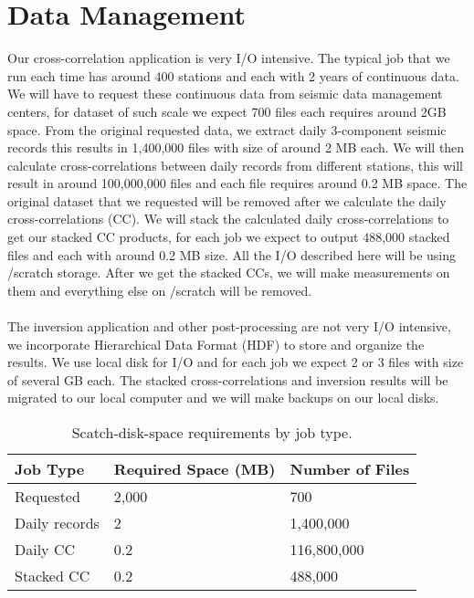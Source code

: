 \documentclass[10pt, letterpaper]{article}
\begin{document}
\section{Data Management}\label{sec:IO}
Our cross-correlation application is very I/O intensive. The typical job that we run each time has around 400 stations and each with 2 years of continuous data. We will have to request these continuous data from seismic data management centers, for dataset of such scale we expect 700 files each requires around 2GB space. From the original requested data, we extract daily 3-component seismic records this results in 1,400,000 files with size of around 2 MB each. We will then calculate cross-correlations between daily records from different stations, this will result in around 100,000,000 files and each file requires around 0.2 MB space. The original dataset that we requested will be removed after we calculate the daily cross-correlations (CC). We will stack the calculated daily cross-correlations to get our stacked CC products, for each job we expect to output 488,000 stacked files and each with around 0.2 MB size. All the I/O described here will be using /scratch storage. After we get the stacked CCs, we will make measurements on them and everything else on /scratch will be removed. \\ \\
The inversion application and other post-processing are not very I/O intensive, we incorporate Hierarchical Data Format (HDF) to store and organize the results. We use local disk for I/O and for each job we expect 2 or 3 files with size of several GB each. The stacked cross-correlations and inversion results will be migrated to our local computer and we will make backups on our local disks.

\begin{table}[h]
\centering
\begin{tabular}{| l | l | l |}
\hline
  Job Type            & Required Space (MB) & Number of Files  \\ \hline
  Requested  & 2,000                   &           700   \\
  Daily records  & 2                &             1,400,000   \\
  Daily CC & 0.2 & 116,800,000 \\
  Stacked CC & 0.2 & 488,000 \\
\hline
\end{tabular}
\caption{\label{tab:space}Scatch-disk-space requirements by job type.}
\end{table}

\end{document}

